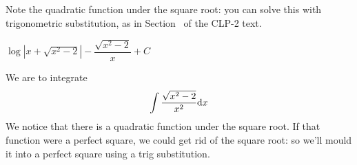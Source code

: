 \begin{hint}
Note the quadratic function under the square root: you can solve this with trigonometric substitution, as in Section~ of the CLP-2 text.
\end{hint}

\begin{answer}
$\log \left| x+{\sqrt{x^2-2}}
\right|-\dfrac{\sqrt{x^2-2}}{x}+C$
\end{answer}

\begin{solution}
We are to integrate
\[\int \frac{\sqrt{x^2-2}}{x^2}\mathrm{d}x\]
We notice that there is a quadratic function under the square root. If that function were a perfect square, we could get rid of the square root: so we'll mould it into a perfect square using a trig substitution.


\end{solution}

